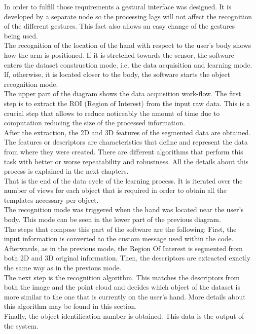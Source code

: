In order to fulfill those requirements a gestural interface was designed. It is developed by a separate node so the processing lags will not affect the recognition of the different gestures. This fact also allows an easy change of the gestures being used. 
\\

The recognition of the location of the hand with respect to the user's body shows how the arm is positioned. If it is stretched towards the sensor, the software enters the dataset construction mode, i.e. the data acquisition and learning mode. If, otherwise, it is located closer to the body, the software starts the object recognition mode. 
\\


The upper part of the diagram shows the data acquisition work-flow. The first step is to extract the ROI (Region of Interest) from the input raw data. This is a crucial step that allows to reduce noticeably the amount of time due to computation reducing the size of the processed information. 
\\

After the extraction, the 2D and 3D features of the segmented data are obtained. The features or descriptors are characteristics that define and represent the data from where they were created. There are different algorithms that perform this task with better or worse repeatability and robustness. All the details about this process is explained in the next chapters. 
\\

That is the end of the data cycle of the learning process. It is iterated over the number of views for each object that is required in order to obtain all the templates necessary per object. 
\\

The recognition mode was triggered when the hand was located near the user's body. This mode can be seen in the lower part of the previous diagram. 
\\

The steps that compose this part of the software are the following: 
First, the input information is converted to the custom message used within the code. Afterwards, as in the previous mode, the Region Of Interest is segmented from both 2D and 3D original information. Then, the descriptors are extracted exactly the same way as in the previous mode. 
\\

The next step is the recognition algorithm. This matches the descriptors from both the image and the point cloud and decides which object of the dataset is more similar to the one that is currently on the user's hand. More details about this algorithm may be found in this section. 
\\

Finally, the object identification number is obtained. This data is the output of the system. 

